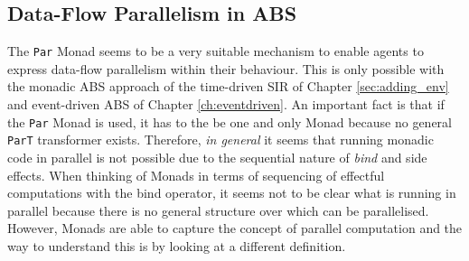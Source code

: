 \subsection{Data-Flow Parallelism in ABS}
\label{sec:dataflow_abs}
The \texttt{Par} Monad seems to be a very suitable mechanism to enable agents to express data-flow parallelism within their behaviour. This is only possible with the monadic ABS approach of the time-driven SIR of Chapter \ref{sec:adding_env} and event-driven ABS of Chapter \ref{ch:eventdriven}. An important fact is that if the \texttt{Par} Monad is used, it has to the be one and only Monad because no general \texttt{ParT} transformer exists. Therefore, \textit{in general} it seems that running monadic code in parallel is not possible due to the sequential nature of \textit{bind} and side effects. When thinking of Monads in terms of sequencing of effectful computations with the bind operator, it seems not to be clear what is running in parallel because there is no general structure over which can be parallelised. However, Monads are able to capture the concept of parallel computation and the way to understand this is by looking at a different definition.


